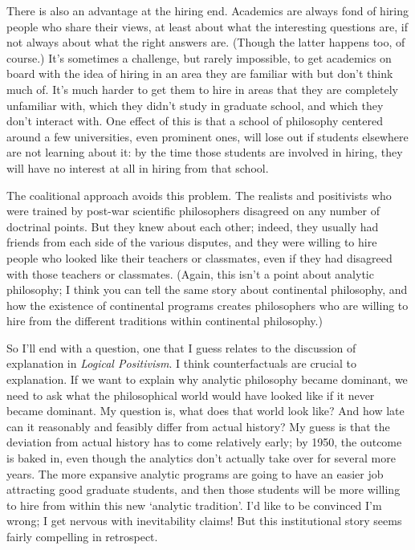 \documentclass[
  11pt,
  letterpaper,
  DIV=11,
  numbers=noendperiod,
  twoside]{scrartcl}
\begin{document}
There is also an advantage at the hiring end. Academics are always fond
of hiring people who share their views, at least about what the
interesting questions are, if not always about what the right answers
are. (Though the latter happens too, of course.) It's sometimes a
challenge, but rarely impossible, to get academics on board with the
idea of hiring in an area they are familiar with but don't think much
of. It's much harder to get them to hire in areas that they are
completely unfamiliar with, which they didn't study in graduate school,
and which they don't interact with. One effect of this is that a school
of philosophy centered around a few universities, even prominent ones,
will lose out if students elsewhere are not learning about it: by the
time those students are involved in hiring, they will have no interest
at all in hiring from that school.

The coalitional approach avoids this problem. The realists and
positivists who were trained by post-war scientific philosophers
disagreed on any number of doctrinal points. But they knew about each
other; indeed, they usually had friends from each side of the various
disputes, and they were willing to hire people who looked like their
teachers or classmates, even if they had disagreed with those teachers
or classmates. (Again, this isn't a point about analytic philosophy; I
think you can tell the same story about continental philosophy, and how
the existence of continental programs creates philosophers who are
willing to hire from the different traditions within continental
philosophy.)

So I'll end with a question, one that I guess relates to the discussion
of explanation in \emph{Logical Positivism}. I think counterfactuals are
crucial to explanation. If we want to explain why analytic philosophy
became dominant, we need to ask what the philosophical world would have
looked like if it never became dominant. My question is, what does that
world look like? And how late can it reasonably and feasibly differ from
actual history? My guess is that the deviation from actual history has
to come relatively early; by 1950, the outcome is baked in, even though
the analytics don't actually take over for several more years. The more
expansive analytic programs are going to have an easier job attracting
good graduate students, and then those students will be more willing to
hire from within this new `analytic tradition'. I'd like to be convinced
I'm wrong; I get nervous with inevitability claims! But this
institutional story seems fairly compelling in retrospect.
\end{document}
